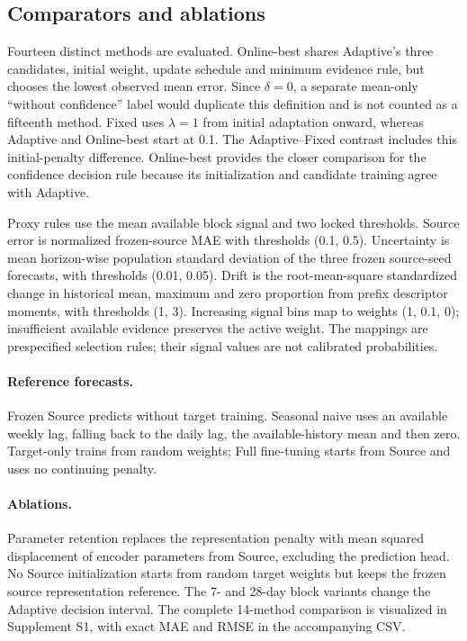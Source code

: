 \documentclass[pdflatex,iicol,sn-mathphys-num]{sn-jnl}
\begin{document}
\subsection{Comparators and ablations}\label{sec:comparators}
Fourteen distinct methods are evaluated. Online-best shares Adaptive's three candidates, initial weight, update schedule and minimum evidence rule, but chooses the lowest observed mean error. Since $\delta=0$, a separate mean-only ``without confidence'' label would duplicate this definition and is not counted as a fifteenth method. Fixed uses $\lambda=1$ from initial adaptation onward, whereas Adaptive and Online-best start at 0.1. The Adaptive--Fixed contrast includes this initial-penalty difference. Online-best provides the closer comparison for the confidence decision rule because its initialization and candidate training agree with Adaptive.

Proxy rules use the mean available block signal and two locked thresholds. Source error is normalized frozen-source MAE with thresholds (0.1, 0.5). Uncertainty is mean horizon-wise population standard deviation of the three frozen source-seed forecasts, with thresholds (0.01, 0.05). Drift is the root-mean-square standardized change in historical mean, maximum and zero proportion from prefix descriptor moments, with thresholds (1, 3). Increasing signal bins map to weights (1, 0.1, 0); insufficient available evidence preserves the active weight. The mappings are prespecified selection rules; their signal values are not calibrated probabilities.

\paragraph{Reference forecasts.} Frozen Source predicts without target training. Seasonal naive uses an available weekly lag, falling back to the daily lag, the available-history mean and then zero. Target-only trains from random weights; Full fine-tuning starts from Source and uses no continuing penalty.
\paragraph{Ablations.} Parameter retention replaces the representation penalty with mean squared displacement of encoder parameters from Source, excluding the prediction head. No Source initialization starts from random target weights but keeps the frozen source representation reference. The 7- and 28-day block variants change the Adaptive decision interval. The complete 14-method comparison is visualized in Supplement S1, with exact MAE and RMSE in the accompanying CSV.
\end{document}
